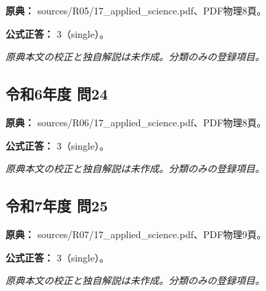\noindent\textbf{原典：} sources/R05/17\_applied\_science.pdf、PDF物理8頁。

\textbf{公式正答：} 3（single）。

\par\textit{原典本文の校正と独自解説は未作成。分類のみの登録項目。}

\subsection{令和6年度 問24}
\label{q:r06-reg-applied-24}

\noindent\textbf{原典：} sources/R06/17\_applied\_science.pdf、PDF物理8頁。

\textbf{公式正答：} 3（single）。

\par\textit{原典本文の校正と独自解説は未作成。分類のみの登録項目。}

\subsection{令和7年度 問25}
\label{q:r07-reg-applied-25}

\noindent\textbf{原典：} sources/R07/17\_applied\_science.pdf、PDF物理9頁。

\textbf{公式正答：} 3（single）。

\par\textit{原典本文の校正と独自解説は未作成。分類のみの登録項目。}
